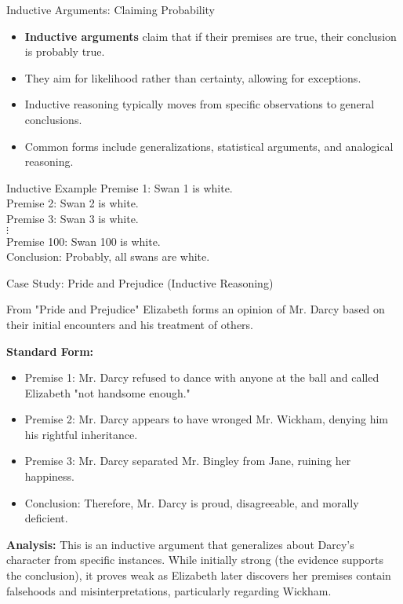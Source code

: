 \documentclass{beamer}
\begin{document}
\begin{frame}{Inductive Arguments: Claiming Probability}
    \begin{itemize}
        \item \textbf{Inductive arguments} claim that if their premises are true, their conclusion is probably true.
        \item They aim for likelihood rather than certainty, allowing for exceptions.
        \item Inductive reasoning typically moves from specific observations to general conclusions.
        \item Common forms include generalizations, statistical arguments, and analogical reasoning.
    \end{itemize}
    
    \begin{exampleblock}{Inductive Example}
        Premise 1: Swan 1 is white.\\
        Premise 2: Swan 2 is white.\\
        Premise 3: Swan 3 is white.\\
        $\vdots$\\
        Premise 100: Swan 100 is white.\\
        Conclusion: Probably, all swans are white.
    \end{exampleblock}
\end{frame}

\begin{frame}{Case Study: Pride and Prejudice (Inductive Reasoning)}
    \small
    \begin{block}{From "Pride and Prejudice"}
        Elizabeth forms an opinion of Mr. Darcy based on their initial encounters and his treatment of others.
    \end{block}
    
    \textbf{Standard Form:}
    \begin{itemize}
        \item Premise 1: Mr. Darcy refused to dance with anyone at the ball and called Elizabeth "not handsome enough."
        \item Premise 2: Mr. Darcy appears to have wronged Mr. Wickham, denying him his rightful inheritance.
        \item Premise 3: Mr. Darcy separated Mr. Bingley from Jane, ruining her happiness.
        \item Conclusion: Therefore, Mr. Darcy is proud, disagreeable, and morally deficient.
    \end{itemize}
    
    \textbf{Analysis:} This is an inductive argument that generalizes about Darcy's character from specific instances. While initially strong (the evidence supports the conclusion), it proves weak as Elizabeth later discovers her premises contain falsehoods and misinterpretations, particularly regarding Wickham.
\end{frame}
\end{document}
